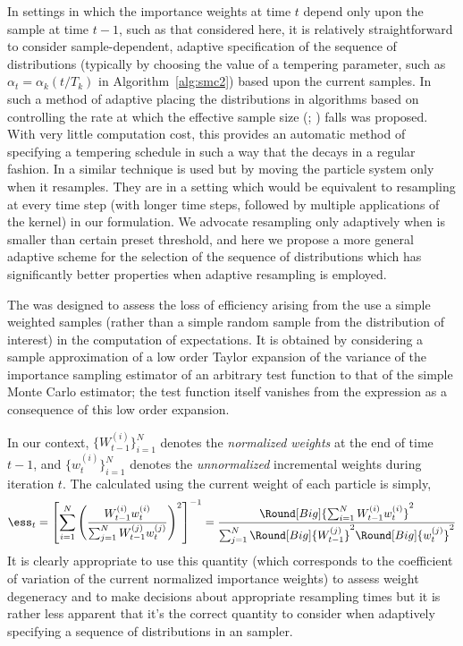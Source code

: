 In settings in which the importance weights at time $t$ depend only upon the
sample at time $t-1$, such as that considered here, it is relatively
straightforward to consider sample-dependent, adaptive specification of the
sequence of distributions (typically by choosing the value of a tempering
parameter, such as $\alpha_t = \alpha_k(t/T_k)$ in Algorithm~\ref{alg:smc2})
based upon the current samples. In \cite{Jasra:2010eh} such a method of
adaptive placing the distributions in \smc algorithms based on controlling the
rate at which the effective sample size (\ess; \cite{Kong:1994ul}) falls was
proposed. With very little computation cost, this provides an automatic method
of specifying a tempering schedule in such a way that the \ess decays in a
regular fashion. In \cite[Algorithm 2]{Schafer:2011bx} a similar technique is
used but by moving the particle system only when it resamples. They are in a
setting which would be equivalent to resampling at every time step (with
longer time steps, followed by multiple applications of the \mcmc kernel) in
our formulation. We advocate resampling only adaptively when \ess is smaller
than certain preset threshold, and here we propose a more general adaptive
scheme for the selection of the sequence of distributions which has
significantly better properties when adaptive resampling is employed.

The \ess was designed to assess the loss of efficiency arising from the use a
simple weighted samples (rather than a simple random sample from the
distribution of interest) in the computation of expectations. It is obtained
by considering a sample approximation of a low order Taylor expansion of the
variance of the importance sampling estimator of an arbitrary test function to
that of the simple Monte Carlo estimator; the test function itself vanishes
from the expression as a consequence of this low order expansion.

In our context, $\{W_{t-1}^{(i)}\}_{i=1}^N$ denotes the \emph{normalized
  weights} at the end of time $t - 1$, and $\{w_t^{(i)}\}_{i=1}^N$ denotes the
\emph{unnormalized} incremental weights during iteration $t$. The \ess
calculated using the current weight of each particle is simply,
\begin{equation}
  \ess_t = \left[ {\sum_{i=1}^N\left( \frac{W_{t-1}^{(i)}
          w_t^{(i)}}{\sum_{j=1}^NW_{t-1}^{(j)}w_t^{(j)}}\right)^2}
  \right]^{-1} = \frac{\Round[Big]{\sum_{i=1}^NW_{t-1}^{(i)}w_t^{(i)}}^2}
  {\sum_{j=1}^N\Round[Big]{W_{t-1}^{(j)}}^2\Round[Big]{w_t^{(j)}}^2}
\end{equation}
It is clearly appropriate to use this quantity (which corresponds to the
coefficient of variation of the current normalized importance weights) to
assess weight degeneracy and to make decisions about appropriate resampling
times \cite{DelMoral:2012jq} but it is rather less apparent that it's
the correct quantity to consider when adaptively specifying a sequence of
distributions in an \smc sampler.

